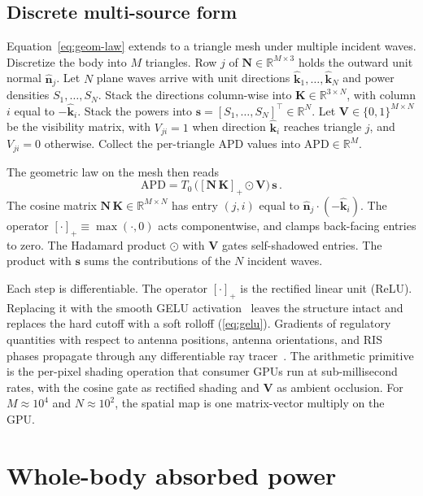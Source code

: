 \documentclass[journal,twocolumn,10pt]{IEEEtran}
\theoremstyle{plain}
\theoremstyle{remark}
\newcommand{\khat}{\hat{\bm{k}}}
\newcommand{\nhat}{\hat{\bm{n}}}
\newcommand{\pospart}[1]{\left[#1\right]_{+}}
\begin{document}
\subsection{Discrete multi-source form}\label{subsec:matrix}
Equation~\eqref{eq:geom-law} extends to a triangle mesh under
multiple incident waves. Discretize the body into $M$ triangles. Row $j$ of
$\mathbf{N} \in \mathbb{R}^{M\times 3}$ holds the outward unit
normal $\nhat_j$. Let $N$ plane waves arrive with unit directions
$\khat_1, \ldots, \khat_N$ and power densities $S_1, \ldots, S_N$.
Stack the directions column-wise into
$\mathbf{K} \in \mathbb{R}^{3\times N}$, with column $i$ equal to
$-\khat_i$. Stack the powers into
$\mathbf{s} = [S_1,\ldots,S_N]^\top \in \mathbb{R}^N$. Let
$\mathbf{V} \in \{0,1\}^{M\times N}$ be the visibility matrix, with
$V_{ji} = 1$ when direction $\khat_i$ reaches triangle $j$, and
$V_{ji} = 0$ otherwise. Collect the per-triangle APD values into
$\bm{\mathrm{APD}} \in \mathbb{R}^{M}$.

The geometric law on the mesh then reads
\begin{equation}\label{eq:mat-multi}
  \bm{\mathrm{APD}} = T_0\,\bigl(\pospart{\mathbf{N}\,\mathbf{K}}
  \odot \mathbf{V}\bigr)\,\mathbf{s}\, .
\end{equation}
The cosine matrix $\mathbf{N}\,\mathbf{K} \in \mathbb{R}^{M\times N}$
has entry $(j,i)$ equal to $\nhat_j\cdot(-\khat_i)$. The operator
$\pospart{\cdot} \equiv \max(\cdot,0)$ acts componentwise, and clamps
back-facing entries to zero. The Hadamard product $\odot$ with
$\mathbf{V}$ gates self-shadowed entries. The product with
$\mathbf{s}$ sums the contributions of the $N$ incident waves.

Each step is differentiable. The operator $\pospart{\cdot}$ is the
rectified linear unit (ReLU). Replacing it with the smooth
\gls{GELU} activation~\cite{Hendrycks2016} leaves the structure
intact and replaces the hard cutoff with a soft rolloff
(\cref{eq:gelu}). Gradients of regulatory quantities with respect to
antenna positions, antenna orientations, and RIS phases propagate
through any differentiable ray tracer~\cite{SionnaRT}. The arithmetic
primitive is the per-pixel shading operation that consumer GPUs run
at sub-millisecond rates, with the cosine gate as rectified shading
and $\mathbf{V}$ as ambient occlusion. For $M \approx 10^4$ and
$N \approx 10^2$, the spatial map is one matrix-vector multiply on
the GPU.


\section{Whole-body absorbed power}\label{sec:cauchy}
\end{document}
